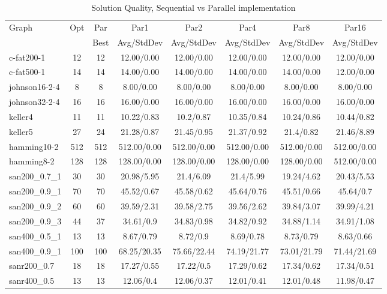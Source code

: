 \documentclass[11pt]{article}
\begin{document}
\linespread{1}
\begin{table*}[ht!]
\caption{Solution Quality, Sequential vs Parallel implementation\label{tab:spar_table}}
\begin{footnotesize}
\begin{center}
\begin{tabular}{|l||c|c||c|c|c|c|c|}
\hline
Graph  &Opt  &Par      &Par1  &Par2 &Par4   &Par8    &Par16\\
       &     &Best     &Avg/StdDev      &Avg/StdDev     &Avg/StdDev       &Avg/StdDev        &Avg/StdDev\\
\hline											            				       
c-fat200-1 	&12 &12	   &12.00/0.00 &12.00/0.00 &12.00/0.00 &12.00/0.00 &12.00/0.00\\
c-fat500-1 	&14 &14	   &14.00/0.00 &14.00/0.00 &14.00/0.00 &14.00/0.00 &12.00/0.00\\
johnson16-2-4 	&8 	&8 	   &8.00/0.00 &8.00/0.00 &8.00/0.00 &8.00/0.00 &8.00/0.00\\
johnson32-2-4 	&16 &16    &16.00/0.00 &16.00/0.00 &16.00/0.00 &16.00/0.00 &16.00/0.00\\
\hline 
keller4 &11 &11 	&10.22/0.83 &10.2/0.87 &10.35/0.84 &10.24/0.86 &10.44/0.82\\
keller5 &27 &24     &21.28/0.87 &21.45/0.95 &21.37/0.92 &21.4/0.82 &21.46/8.89\\
hamming10-2 &512 &512 &512.00/0.00 &512.00/0.00 &512.00/0.00 &512.00/0.00 &512.00/0.00\\
hamming8-2 	&128 &128 &128.00/0.00 &128.00/0.00 &128.00/0.00 &128.00/0.00 &512.00/0.00\\
\hline
san200\_0.7\_1 	&30 &30 &20.98/5.95 &21.4/6.09 &21.4/5.99 &19.24/4.62 &20.43/5.53\\
san200\_0.9\_1 	&70 &70 &45.52/0.67 &45.58/0.62 &45.64/0.76 &45.51/0.66 &45.64/0.7\\
san200\_0.9\_2 	&60 &60 &39.59/2.31 &39.58/2.75 &39.56/2.62 &39.84/3.07 &39.99/4.21\\
san200\_0.9\_3 	&44 &37 &34.61/0.9 &34.83/0.98 &34.82/0.92 &34.88/1.14 &34.91/1.08\\
san400\_0.5\_1 	&13 &13 &8.67/0.79 &8.72/0.9 &8.69/0.78 &8.73/0.79 &8.63/0.66\\
san400\_0.9\_1 	&100 &100 &68.25/20.35 &75.66/22.44 &74.19/21.77 &73.01/21.79 &71.44/21.69\\
\hline
sanr200\_0.7 	&18 &18  &17.27/0.55 &17.22/0.5 &17.29/0.62 &17.34/0.62 &17.34/0.51\\
sanr400\_0.5 	&13 &13  &12.06/0.4 &12.06/0.37 &12.01/0.41 &12.01/0.48 &11.98/0.47\\

\end{tabular}
\end{center}
\end{footnotesize}
\end{table*}
\end{document}
